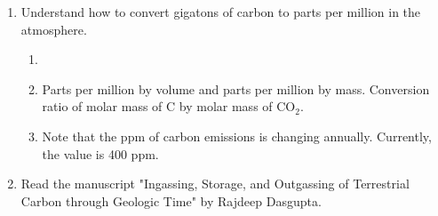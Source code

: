 \documentclass[final,10pt,reqno,twoside]{article}
\begin{document}
  \begin{enumerate}[leftmargin=0cm, align=left]






    \item \label{Prob:Item_01} Understand how to convert gigatons of carbon to parts per million in the atmosphere.
             \begin{enumerate}[label=\textbf{(\alph*})]
   				 \item {}
   				 \item Parts per million by volume and parts per million by mass. Conversion ratio of molar mass of C by molar mass of CO$_2$.
   				 \item Note that the ppm of carbon emissions is changing annually. Currently, the value is 400 ppm.
             \end{enumerate}
    \item Read the manuscript "Ingassing, Storage, and Outgassing of Terrestrial Carbon through Geologic Time" by Rajdeep Dasgupta.


\end{enumerate}
\end{document}
